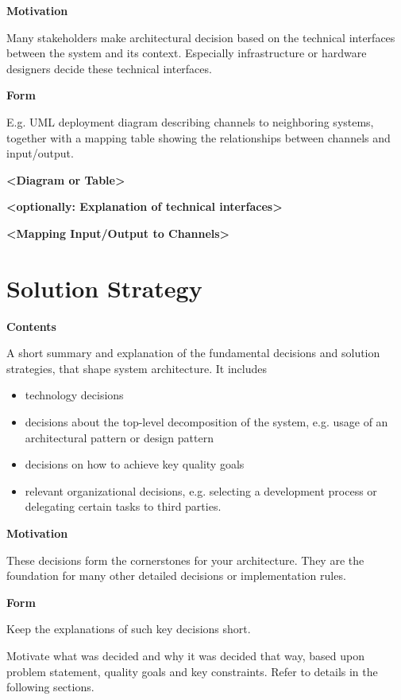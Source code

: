 \documentclass[
]{article}
\begin{document}
\textbf{Motivation}

Many stakeholders make architectural decision based on the technical
interfaces between the system and its context. Especially infrastructure
or hardware designers decide these technical interfaces.

\textbf{Form}

E.g. UML deployment diagram describing channels to neighboring systems,
together with a mapping table showing the relationships between channels
and input/output.

\textbf{\textless Diagram or Table\textgreater{}}

\textbf{\textless optionally: Explanation of technical
interfaces\textgreater{}}

\textbf{\textless Mapping Input/Output to Channels\textgreater{}}

\hypertarget{section-solution-strategy}{%
\section{Solution Strategy}\label{section-solution-strategy}}

\textbf{Contents}

A short summary and explanation of the fundamental decisions and
solution strategies, that shape system architecture. It includes

\begin{itemize}
\item
  technology decisions
\item
  decisions about the top-level decomposition of the system, e.g. usage
  of an architectural pattern or design pattern
\item
  decisions on how to achieve key quality goals
\item
  relevant organizational decisions, e.g. selecting a development
  process or delegating certain tasks to third parties.
\end{itemize}

\textbf{Motivation}

These decisions form the cornerstones for your architecture. They are
the foundation for many other detailed decisions or implementation
rules.

\textbf{Form}

Keep the explanations of such key decisions short.

Motivate what was decided and why it was decided that way, based upon
problem statement, quality goals and key constraints. Refer to details
in the following sections.
\end{document}
